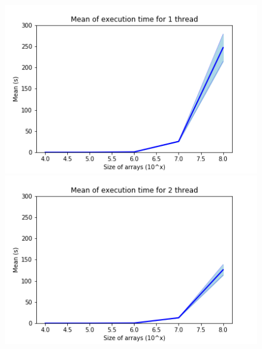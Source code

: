 \documentclass[a4paper,12pt]{article}
\begin{document}
    \begin{figure}[ht]
        \centering
        \includegraphics[width = 0.45\linewidth]{Mean of execution time for 1 thread.png}
        \includegraphics[width = 0.45\linewidth]{Mean of execution time for 2 thread.png}

    \end{figure}
\end{document}
